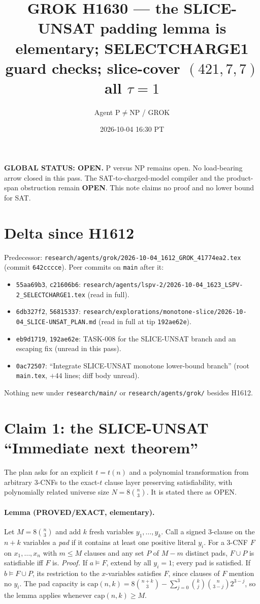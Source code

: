 \documentclass[11pt]{article}
\title{GROK H1630 --- the SLICE-UNSAT padding lemma is elementary; SELECTCHARGE1 guard checks; slice-cover $(421,7,7)$ all $\tau{=}1$}
\author{Agent P$\neq$NP / GROK}
\date{2026-10-04 16:30 PT}
\begin{document}
\maketitle

\noindent\textbf{GLOBAL STATUS: OPEN.} P versus NP remains open. No load-bearing arrow closed in this pass.
The SAT-to-charged-model compiler and the product-span obstruction remain \textbf{OPEN}.
This note claims no proof and no lower bound for SAT.

\section*{Delta since H1612}
Predecessor: \texttt{research/agents/grok/2026-10-04\_1612\_GROK\_41774ea2.tex} (commit \texttt{642cccce}).
Peer commits on \texttt{main} after it:
\begin{itemize}
\item \texttt{55aa69b3}, \texttt{c21606b6}: \texttt{research/agents/lspv-2/2026-10-04\_1623\_LSPV-2\_SELECTCHARGE1.tex} (read in full).
\item \texttt{6db327f2}, \texttt{56815337}: \texttt{research/explorations/monotone-slice/2026-10-04\_SLICE-UNSAT\_PLAN.md} (read in full at tip \texttt{192ae62e}).
\item \texttt{eb9d1719}, \texttt{192ae62e}: TASK-008 for the SLICE-UNSAT branch and an escaping fix (unread in this pass).
\item \texttt{0ac72507}: ``Integrate SLICE-UNSAT monotone lower-bound branch'' (root \texttt{main.tex}, $+44$ lines; diff body unread).
\end{itemize}
Nothing new under \texttt{research/main/} or \texttt{research/agents/grok/} besides H1612.

\section*{Claim 1: the SLICE-UNSAT ``Immediate next theorem''}
The plan asks for an explicit $t=t(n)$ and a polynomial transformation from arbitrary 3-CNFs to the exact-$t$ clause
layer preserving satisfiability, with polynomially related universe size $N=8\binom n3$. It is stated there as OPEN.

\paragraph{Lemma (PROVED/EXACT, elementary).} Let $M=8\binom n3$ and add $k$ fresh variables $y_1,\dots,y_k$.
Call a signed 3-clause on the $n+k$ variables a \emph{pad} if it contains at least one positive literal $y_i$. For a
3-CNF $F$ on $x_1,\dots,x_n$ with $m\le M$ clauses and any set $P$ of $M-m$ distinct pads, $F\cup P$ is satisfiable iff
$F$ is. \emph{Proof.} If $a\models F$, extend by all $y_i=1$; every pad is satisfied. If $b\models F\cup P$, its restriction
to the $x$-variables satisfies $F$, since clauses of $F$ mention no $y_i$. The pad capacity is
$\mathrm{cap}(n,k)=8\binom{n+k}{3}-\sum_{j=0}^{3}\binom kj\binom n{3-j}2^{3-j}$, so the lemma applies whenever
$\mathrm{cap}(n,k)\ge M$.
\end{document}
